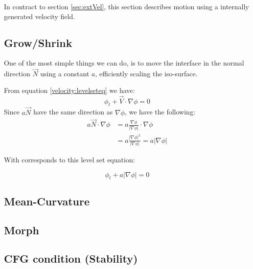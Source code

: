 

In contract to section \vref{sec:extVel}, this section describes
motion using a internally generated velocity field.

\newpage

\subsection{Grow/Shrink}


One of the most simple things we can do, is to move the interface in
the normal direction $\vec{N}$ using a constant $a$, efficiently
scaling the iso-surface.

From equation \vref{velocity:levelseteq} we have:
\begin{equation}
  \phi_t + \vec{V}\cdot \nabla \phi = 0
\end{equation}
Since $a\vec{N}$ have the same direction as $\nabla{\phi}$, we have the following:
\begin{align*}
  a\vec{N}\cdot\nabla\phi &=
  a\frac{\nabla\phi}{|\nabla\phi|}\cdot\nabla\phi \\
  &= a\frac{|\nabla\phi|^2}{|\nabla\phi|} 
  = a|\nabla\phi|
\end{align*}

With corresponds to this level set equation:

\begin{equation}
  \phi_t + a |\nabla \phi| = 0
\end{equation}



\subsection{Mean-Curvature}

\subsection{Morph}

\subsection{CFG condition (Stability)}



